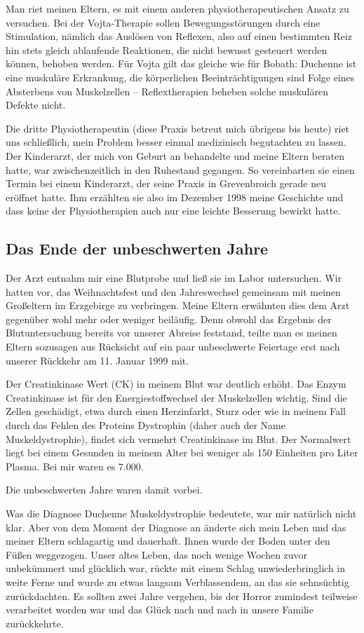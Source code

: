 \documentclass[fontsize=14pt,a4paper,headinclude,DIV=calc,automark]{scrbook}
\begin{document}
Man riet meinen Eltern, es mit einem anderen physiotherapeutischen Ansatz zu versuchen. Bei der Vojta-Therapie sollen Bewegungsstörungen durch eine Stimulation, nämlich das Auslösen von Reflexen, also auf einen bestimmten Reiz hin stets gleich ablaufende Reaktionen, die nicht bewusst gesteuert werden können, behoben werden. Für Vojta gilt das gleiche wie für Bobath: Duchenne ist eine muskuläre Erkrankung, die körperlichen Beeinträchtigungen sind Folge eines Absterbens von Muskelzellen – Reflextherapien beheben solche muskulären Defekte nicht.

Die dritte Physiotherapeutin (diese Praxis betreut mich übrigens bis heute) riet uns schließlich, mein Problem besser einmal medizinisch begutachten zu lassen. Der Kinderarzt, der mich von Geburt an behandelte und meine Eltern beraten hatte, war zwischenzeitlich in den Ruhestand gegangen. So vereinbarten sie einen Termin bei einem Kinderarzt, der seine Praxis in Grevenbroich gerade neu eröffnet hatte. Ihm erzählten sie also im Dezember 1998 meine Geschichte und dass keine der Physiotherapien auch nur eine leichte Besserung bewirkt hatte.

\subsection{Das Ende der unbeschwerten Jahre}

Der Arzt entnahm mir eine Blutprobe und ließ sie im Labor untersuchen. Wir hatten vor, das Weihnachtsfest und den Jahreswechsel gemeinsam mit meinen Großeltern im Erzgebirge zu verbringen. Meine Eltern erwähnten dies dem Arzt gegenüber wohl mehr oder weniger beiläufig. Denn obwohl das Ergebnis der Blutuntersuchung bereits vor unserer Abreise feststand, teilte man es meinen Eltern sozusagen aus Rücksicht auf ein paar unbeschwerte Feiertage erst nach unserer Rückkehr am 11. Januar 1999 mit.

Der Creatinkinase Wert (CK) in meinem Blut war deutlich erhöht. Das Enzym Creatinkinase ist für den Energiestoffwechsel der Muskelzellen wichtig. Sind die Zellen geschädigt, etwa durch einen Herzinfarkt, Sturz oder wie in meinem Fall durch das Fehlen des Proteins Dystrophin (daher auch der Name Muskeldystrophie), findet sich vermehrt Creatinkinase im Blut. Der Normalwert liegt bei einem Gesunden in meinem Alter bei weniger als 150 Einheiten pro Liter Plasma. Bei mir waren es 7.000. 

Die unbeschwerten Jahre waren damit vorbei.

Was die Diagnose Duchenne Muskeldystrophie bedeutete, war mir natürlich nicht klar. Aber von dem Moment der Diagnose an änderte sich mein Leben und das meiner Eltern schlagartig und dauerhaft. Ihnen wurde der Boden unter den Füßen weggezogen. Unser altes Leben, das noch wenige Wochen zuvor unbekümmert und glücklich war, rückte mit einem Schlag unwiederbringlich in weite Ferne und wurde zu etwas langsam Verblassendem, an das sie sehnsüchtig zurückdachten. Es sollten zwei Jahre vergehen, bis der Horror zumindest teilweise verarbeitet worden war und das Glück nach und nach in unsere Familie zurückkehrte.
\end{document}
